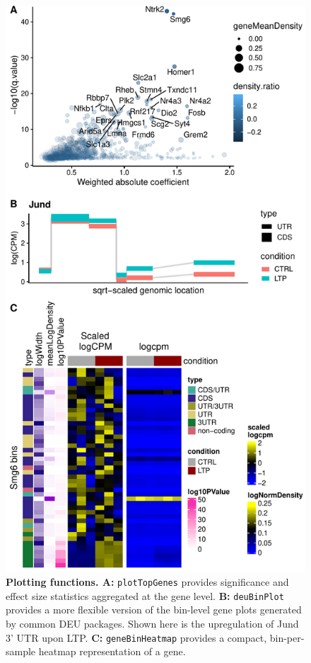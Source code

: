 \documentclass{bmcart}
\begin{document}
\begin{figure}
\includegraphics[height=0.6\textheight]{examples.pdf}
\caption{\textbf{Plotting functions. A:} \texttt{plotTopGenes} provides significance and effect size statistics aggregated at the gene level. \textbf{B:} \texttt{deuBinPlot} provides a more flexible version of the bin-level gene plots generated by common DEU packages. Shown here is the upregulation of Jund 3' UTR upon LTP. \textbf{C:} \texttt{geneBinHeatmap} provides a compact, bin-per-sample heatmap representation of a gene.}
\label{fig:plots}
\end{figure}
\end{document}
